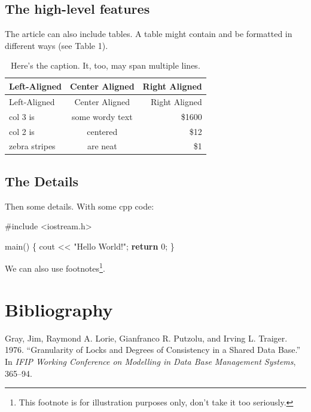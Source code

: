 \documentclass[]{article}
\newenvironment{Shaded}{\begin{snugshade}}{\end{snugshade}}
\newcommand{\KeywordTok}[1]{\textcolor[rgb]{0.13,0.29,0.53}{\textbf{{#1}}}}
\newcommand{\DecValTok}[1]{\textcolor[rgb]{0.00,0.00,0.81}{{#1}}}
\newcommand{\StringTok}[1]{\textcolor[rgb]{0.31,0.60,0.02}{{#1}}}
\newcommand{\OtherTok}[1]{\textcolor[rgb]{0.56,0.35,0.01}{{#1}}}
\newcommand{\NormalTok}[1]{{#1}}
\begin{document}
\subsection{The high-level features}\label{the-high-level-features}

The article can also include tables. A table might contain and be
formatted in different ways (see Table 1).

\begin{longtable}[c]{@{}lcr@{}}
\caption{Here's the caption. It, too, may span multiple
lines.}\tabularnewline
\toprule
Left-Aligned & Center Aligned & Right Aligned\tabularnewline
\midrule
\endfirsthead
\toprule
Left-Aligned & Center Aligned & Right Aligned\tabularnewline
\midrule
\endhead
col 3 is & some wordy text & \$1600\tabularnewline
col 2 is & centered & \$12\tabularnewline
zebra stripes & are neat & \$1\tabularnewline
\bottomrule
\end{longtable}

\subsection{The Details}\label{the-details}

Then some details. With some cpp code:

\begin{Shaded}
\begin{Highlighting}[]
\OtherTok{#include <iostream.h>}

\NormalTok{main()}
\NormalTok{\{}
    \NormalTok{cout << }\StringTok{"Hello World!"}\NormalTok{;}
    \KeywordTok{return} \DecValTok{0}\NormalTok{;}
\NormalTok{\}}
\end{Highlighting}
\end{Shaded}

We can also use footnotes\footnote{This footnote is for illustration
  purposes only, don't take it too seriously.}.

\section{Bibliography}\label{bibliography}

\noindent
\vspace{-2em} \setlength{\parindent}{-0.26in}
\setlength{\leftskip}{0.2in} \setlength{\parskip}{8pt}

Gray, Jim, Raymond A. Lorie, Gianfranco R. Putzolu, and Irving L.
Traiger. 1976. ``Granularity of Locks and Degrees of Consistency in a
Shared Data Base.'' In \emph{IFIP Working Conference on Modelling in
Data Base Management Systems}, 365--94.
\end{document}
